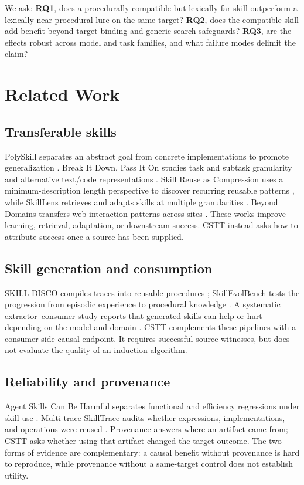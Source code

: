 \documentclass[pdflatex,sn-mathphys-num]{sn-jnl}
\begin{document}
We ask: \textbf{RQ1}, does a procedurally compatible but lexically far skill
outperform a lexically near procedural lure on the same target? \textbf{RQ2},
does the compatible skill add benefit beyond target binding and generic search
safeguards? \textbf{RQ3}, are the effects robust across model and task families,
and what failure modes delimit the claim?

\section{Related Work}
\subsection{Transferable skills}
PolySkill separates an abstract goal from concrete implementations to promote
generalization \citep{yu2026polyskill}. Break It Down, Pass It On studies task and
subtask granularity and alternative text/code representations
\citep{feng2026breakdown}. Skill Reuse as Compression uses a minimum-description
length perspective to discover recurring reusable patterns
\citep{xu2026compression}, while SkillLens retrieves and adapts skills at
multiple granularities \citep{miao2026skilllens}. Beyond Domains transfers web
interaction patterns across sites \citep{he2026beyond}. These works improve
learning, retrieval, adaptation, or downstream success. CSTT instead asks how
to attribute success once a source has been supplied.

\subsection{Skill generation and consumption}
SKILL-DISCO compiles traces into reusable procedures
\citep{guo2026skilldisco}; SkillEvolBench tests the progression from episodic
experience to procedural knowledge \citep{lei2026skillevolbench}. A systematic
extractor--consumer study reports that generated skills can help or hurt
depending on the model and domain \citep{huang2026consumption}. CSTT complements
these pipelines with a consumer-side causal endpoint. It requires successful
source witnesses, but does not evaluate the quality of an induction algorithm.

\subsection{Reliability and provenance}
Agent Skills Can Be Harmful separates functional and efficiency regressions
under skill use \citep{dong2026harmful}. Multi-trace SkillTrace audits whether
expressions, implementations, and operations were reused
\citep{chen2026multitrace}. Provenance answers where an artifact came from;
CSTT asks whether using that artifact changed the target outcome. The two forms
of evidence are complementary: a causal benefit without provenance is hard to
reproduce, while provenance without a same-target control does not establish
utility.
\end{document}
